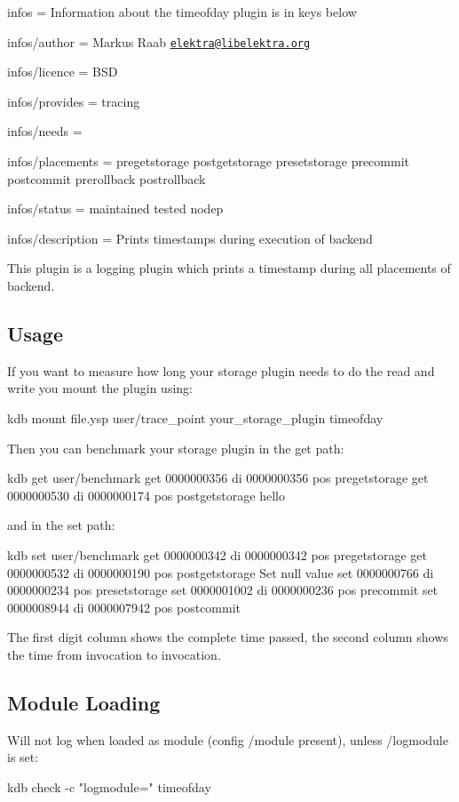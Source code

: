 
\begin{DoxyItemize}
\item infos = Information about the timeofday plugin is in keys below
\item infos/author = Markus Raab \href{mailto:elektra@libelektra.org}{\tt elektra@libelektra.\+org}
\item infos/licence = B\+S\+D
\item infos/provides = tracing
\item infos/needs =
\item infos/placements = pregetstorage postgetstorage presetstorage precommit postcommit prerollback postrollback
\item infos/status = maintained tested nodep
\item infos/description = Prints timestamps during execution of backend
\end{DoxyItemize}

This plugin is a logging plugin which prints a timestamp during all placements of backend.

\subsection*{Usage}

If you want to measure how long your storage plugin needs to do the read and write you mount the plugin using\+: \begin{DoxyVerb}kdb mount file.ysp user/trace_point your_storage_plugin timeofday
\end{DoxyVerb}


Then you can benchmark your storage plugin in the get path\+: \begin{DoxyVerb}kdb get user/benchmark
get     0000000356      di      0000000356      pos     pregetstorage
get     0000000530      di      0000000174      pos     postgetstorage
hello
\end{DoxyVerb}


and in the set path\+: \begin{DoxyVerb}kdb set user/benchmark
get     0000000342      di      0000000342      pos     pregetstorage
get     0000000532      di      0000000190      pos     postgetstorage
Set null value
set     0000000766      di      0000000234      pos     presetstorage
set     0000001002      di      0000000236      pos     precommit
set     0000008944      di      0000007942      pos     postcommit
\end{DoxyVerb}


The first digit column shows the complete time passed, the second column shows the time from invocation to invocation.

\subsection*{Module Loading}

Will not log when loaded as module (config {\ttfamily /module} present), unless {\ttfamily /logmodule} is set\+: \begin{DoxyVerb}kdb check -c "logmodule=" timeofday\end{DoxyVerb}
 